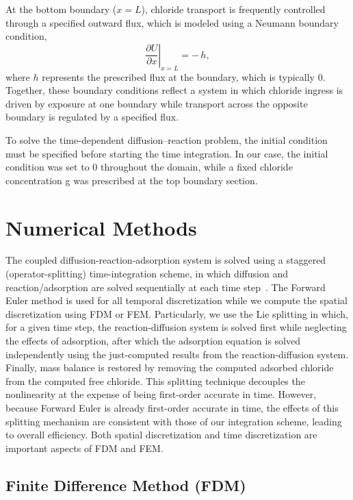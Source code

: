 \documentclass[conference]{IEEEtran}
\begin{document}
At the bottom boundary ($x=L$), chloride transport is frequently controlled through a specified outward flux, which is modeled using a Neumann boundary condition,
\begin{equation}
\left.
\frac{\partial U}{\partial x}
\right|_{x=L}
=
-\,h,
\label{eq:bc_neumann}
\end{equation}
where $h$ represents the prescribed flux at the boundary, which is typically $0$. Together, these boundary conditions reflect a system in which chloride ingress is driven by exposure at one boundary while transport across the opposite boundary is regulated by a specified flux.

To solve the time-dependent diffusion–reaction problem, the initial condition must be specified before starting the time integration. 
In our case, the initial condition was set to {0} throughout the domain, while a fixed chloride concentration g was prescribed at the top boundary section.


\section{Numerical Methods}

The coupled diffusion-reaction-adsorption system is solved using a staggered (operator-splitting) time-integration scheme, in which diffusion and reaction/adsorption are solved sequentially at each time step~\cite{b17}. 
The Forward Euler method is used for all temporal discretization while we compute the spatial discretization using FDM or FEM.
Particularly, we use the Lie splitting \cite{b17} in which, for a given time step, the reaction-diffusion system is solved first while neglecting the effects of adsorption, after which the adsorption equation is solved independently using the just-computed results from the reaction-diffusion system.
Finally, mass balance is restored by removing the computed adsorbed chloride from the computed free chloride.
This splitting technique decouples the nonlinearity at the expense of being first-order accurate in time. 
However, because Forward Euler is already first-order accurate in time, the effects of this splitting mechanism are consistent with those of our integration scheme, leading to overall efficiency. Both spatial discretization and time discretization are important aspects of FDM and FEM.

\subsection{Finite Difference Method (FDM)}\label{AA}
\end{document}
